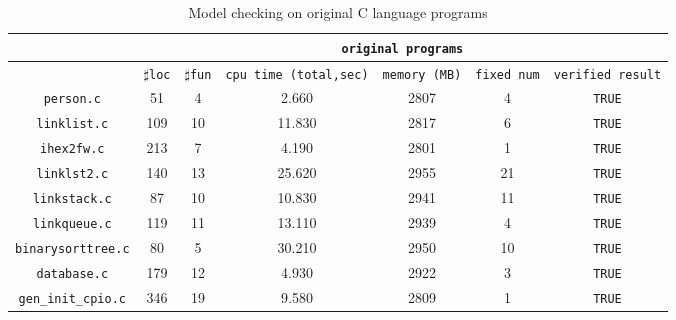 \begin{table}
  \scriptsize
\begin{tabular}{|c|c|c|c|c|c|c|}
\hline
& \multicolumn{6}{|c|}{\texttt{original programs}}  \\
\hline
 & $\sharp$\texttt{loc} & $\sharp$\texttt{fun} & \texttt{cpu time (total,sec)} & \texttt{memory (MB)} & \texttt{fixed num}& \texttt{verified result} \\
\hline
\texttt{person.c} & 51 & 4 & 2.660 & 2807 & 4 & \texttt{TRUE}   \\
\hline
\texttt{linklist.c} & 109 & 10 & 11.830 & 2817 & 6 & \texttt{TRUE}  \\
\hline
\texttt{ihex2fw.c} & 213 & 7 & 4.190 & 2801 & 1 &  \texttt{TRUE} \\
\hline
\texttt{linklst2.c} & 140 & 13 & 25.620 & 2955 & 21 & \texttt{TRUE} \\
\hline
\texttt{linkstack.c}  & 87 & 10 & 10.830 & 2941 & 11 & \texttt{TRUE} \\
\hline
\texttt{linkqueue.c} & 119 & 11 & 13.110 & 2939 & 4 & \texttt{TRUE} \\
\hline
\texttt{binarysorttree.c} & 80 & 5 & 30.210 & 2950 & 10 &\texttt{TRUE}  \\
\hline
\texttt{database.c} & 179 & 12 & 4.930 & 2922 & 3 & \texttt{TRUE} \\
\hline
\texttt{gen\_init\_cpio.c} & 346 & 19 & 9.580 & 2809 & 1 & \texttt{TRUE} \\
\hline
\end{tabular}
\caption{Model checking on original C language programs}
\label{tb:mcc}
\end{table}

